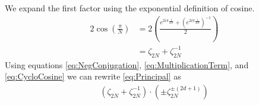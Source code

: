 \documentclass{article}
\begin{document}
We expand the first factor using the exponential definition of cosine.
\begin{align}
	2\cos\left(\frac{\pi}{N}\right) &= 2\left(\frac{e^{2i\pi\frac{1}{2N}} + \left(e^{2i\pi\frac{1}{2N}}\right)^{-1}}{2}\right) \nonumber
	\\ &=\zeta_{2N} + \zeta_{2N}^{-1} \label{eq:CycloCosine}
\end{align}
Using equations \eqref{eq:NegConjugation}, \eqref{eq:MultiplicationTerm}, and \eqref{eq:CycloCosine} we can rewrite \eqref{eq:Principal} as 
\begin{align}
	\left(\zeta_{2N} + \zeta_{2N}^{-1}\right)\cdot\left(\pm\zeta_{2N}^{\pm (2d + 1)}\right)
\end{align}
\end{document}
